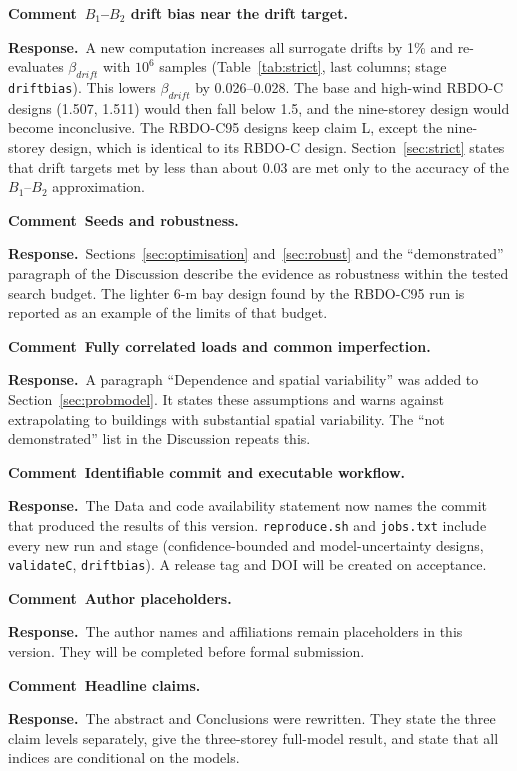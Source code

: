 \documentclass[11pt]{article}
\newenvironment{comment}[1]{\par\medskip\noindent\textbf{Comment~#1.}\ \itshape}{\par}
\newcommand{\resp}{\par\noindent\textbf{Response.}\ }
\begin{document}
\begin{comment}{$B_1$--$B_2$ drift bias near the drift target}
\end{comment}
\resp A new computation increases all surrogate drifts by 1\% and re-evaluates $\beta_{drift}$ with
$10^6$ samples (Table~\ref{tab:strict}, last columns; stage \texttt{driftbias}). This lowers
$\beta_{drift}$ by 0.026--0.028. The base and high-wind RBDO-C designs (1.507, 1.511) would then fall
below 1.5, and the nine-storey design would become inconclusive. The RBDO-C95 designs keep claim L,
except the nine-storey design, which is identical to its RBDO-C design. Section~\ref{sec:strict}
states that drift targets met by less than about 0.03 are met only to the accuracy of the $B_1$--$B_2$
approximation.

\begin{comment}{Seeds and robustness}
\end{comment}
\resp Sections~\ref{sec:optimisation} and~\ref{sec:robust} and the ``demonstrated'' paragraph of the
Discussion describe the evidence as robustness within the tested search budget. The lighter 6-m bay
design found by the RBDO-C95 run is reported as an example of the limits of that budget.

\begin{comment}{Fully correlated loads and common imperfection}
\end{comment}
\resp A paragraph ``Dependence and spatial variability'' was added to Section~\ref{sec:probmodel}. It
states these assumptions and warns against extrapolating to buildings with substantial spatial
variability. The ``not demonstrated'' list in the Discussion repeats this.

\begin{comment}{Identifiable commit and executable workflow}
\end{comment}
\resp The Data and code availability statement now names the commit that produced the results of
this version. \texttt{reproduce.sh} and \texttt{jobs.txt} include every new run and stage
(confidence-bounded and model-uncertainty designs, \texttt{validateC}, \texttt{driftbias}). A
release tag and DOI will be created on acceptance.

\begin{comment}{Author placeholders}
\end{comment}
\resp The author names and affiliations remain placeholders in this version. They will be completed
before formal submission.

\begin{comment}{Headline claims}
\end{comment}
\resp The abstract and Conclusions were rewritten. They state the three claim levels separately,
give the three-storey full-model result, and state that all indices are conditional on the models.
\end{document}

